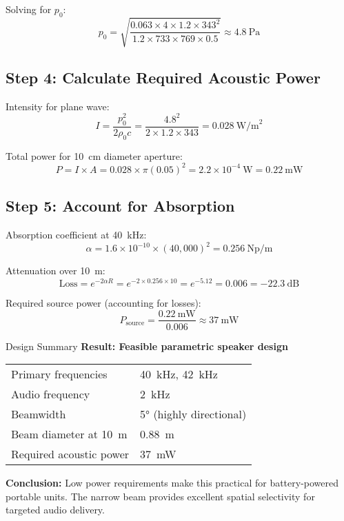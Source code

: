 Solving for $p_0$:
\begin{equation}
p_0 = \sqrt{\frac{0.063 \times 4 \times 1.2 \times 343^2}{1.2 \times 733 \times 769 \times 0.5}} \approx 4.8~\text{Pa}
\end{equation}

\subsection*{Step 4: Calculate Required Acoustic Power}

Intensity for plane wave:
\begin{equation}
I = \frac{p_0^2}{2\rho_0 c} = \frac{4.8^2}{2 \times 1.2 \times 343} = 0.028~\text{W/m}^2
\end{equation}

Total power for 10~cm diameter aperture:
\begin{equation}
P = I \times A = 0.028 \times \pi(0.05)^2 = 2.2 \times 10^{-4}~\text{W} = 0.22~\text{mW}
\end{equation}

\subsection*{Step 5: Account for Absorption}

Absorption coefficient at 40~kHz:
\begin{equation}
\alpha = 1.6 \times 10^{-10} \times (40{,}000)^2 = 0.256~\text{Np/m}
\end{equation}

Attenuation over 10~m:
\begin{equation}
\text{Loss} = e^{-2\alpha R} = e^{-2 \times 0.256 \times 10} = e^{-5.12} = 0.006 = -22.3~\text{dB}
\end{equation}

Required source power (accounting for losses):
\begin{equation}
P_{\text{source}} = \frac{0.22~\text{mW}}{0.006} \approx 37~\text{mW}
\end{equation}

\begin{calloutbox}[colback=black!5!white,colframe=black]{Design Summary}
\textbf{Result: Feasible parametric speaker design}

\begin{tabular}{@{}ll@{}}
Primary frequencies & 40~kHz, 42~kHz \\
Audio frequency & 2~kHz \\
Beamwidth & 5° (highly directional) \\
Beam diameter at 10~m & 0.88~m \\
Required acoustic power & 37~mW \\
\end{tabular}

\textbf{Conclusion:} Low power requirements make this practical for battery-powered portable units. The narrow beam provides excellent spatial selectivity for targeted audio delivery.
\end{calloutbox}

